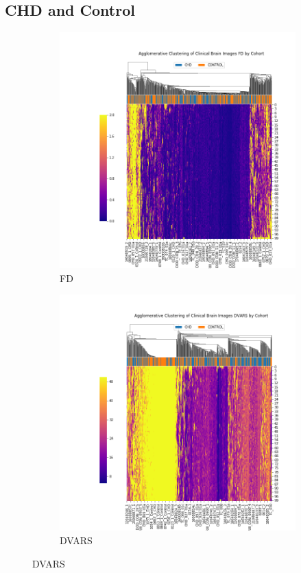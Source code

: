 \clearpage

\subsection{CHD and Control}

\begin{figure}[t]
	\centering
	\begin{subfigure}{0.49\textwidth}
		\centering
		\includegraphics[width=1.0\textwidth]{6/figures/cohort-bold-fd-sns-agg.png}
		\caption{FD}
	\end{subfigure}
	\begin{subfigure}{0.49\textwidth}
		\centering
		\includegraphics[width=1.0\textwidth]{6/figures/cohort-bold-dvars-sns-agg.png}
		\caption{DVARS}
	\end{subfigure}
	

\end{figure}
